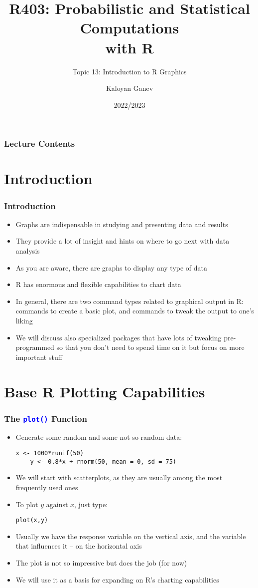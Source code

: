 \documentclass[10pt]{beamer}
\title{R403: Probabilistic and Statistical Computations\\ with R}
\subtitle{Topic 13: \textcolor{myred}{Introduction to R Graphics}}
\author{Kaloyan Ganev}
\date{2022/2023}
\newcommand{\cc}[1]{\texttt{\textcolor{blue}{#1}}}
\theoremstyle{definition}
\begin{document}
\maketitle

\begin{frame}[fragile]
\frametitle{Lecture Contents}
\tableofcontents
\end{frame}

\section{Introduction}
\begin{frame}[fragile]
\frametitle{Introduction}
\begin{itemize}
	\item Graphs are indispensable in studying and presenting data and results
	\item They provide a lot of insight and hints on where to go next with data analysis
	\item As you are aware, there are graphs to display any type of data
	\item R has enormous and flexible capabilities to chart data
	\item In general, there are two command types related to graphical output in R: commands to create a basic plot, and commands to tweak the output to one's liking
	\item We will discuss also specialized packages that have lots of tweaking pre-programmed so that you don't need to spend time on it but focus on more important stuff
\end{itemize}
\end{frame}

\section{Base R Plotting Capabilities}
\begin{frame}[fragile]
\frametitle{The \cc{plot()} Function}
\begin{itemize}
	\item Generate some random and some not-so-random data:
	\begin{lstlisting}[style = rstyle, breaklines]
	x <- 1000*runif(50)
	y <- 0.8*x + rnorm(50, mean = 0, sd = 75)
	\end{lstlisting}
	\item We will start with scatterplots, as they are usually among the most frequently used ones
	\item To plot $y$ against $x$, just type:
	\begin{lstlisting}[style = rstyle, breaklines]
	plot(x,y)	
	\end{lstlisting}
	\item Usually we have the response variable on the vertical axis, and the variable that influences it -- on the horizontal axis
	\item The plot is not so impressive but does the job (for now)
	\item We will use it as a basis for expanding on R's charting capabilities
\end{itemize}
\end{frame}
\end{document}
